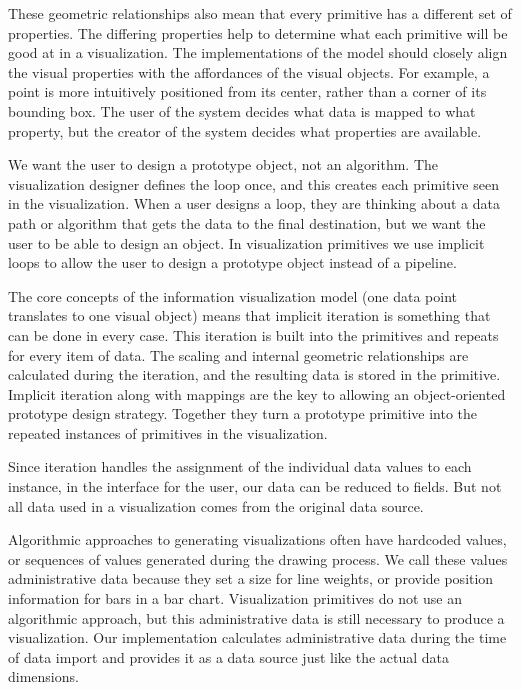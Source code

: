 These geometric relationships also mean that every primitive has a different set of properties.
The differing properties help to determine what each primitive will be good at in a visualization.
The implementations of the model should closely align the visual properties with the affordances of the visual objects.
For example, a point is more intuitively positioned from its center, rather than a corner of its bounding box.
The user of the system decides what data is mapped to what property, but the creator of the system decides what properties are available.

\label{iteration}

We want the user to design a prototype object, not an algorithm.
The visualization designer defines the loop once, and this creates each primitive seen in the visualization.
When a user designs a loop, they are thinking about a data path or algorithm that gets the data to the final destination, but we want the user to be able to design an object.
In visualization primitives we use implicit loops to allow the user to design a prototype object instead of a pipeline.

The core concepts of the information visualization model (one data point translates to one visual object) means that implicit iteration is something that can be done in every case.
This iteration is built into the primitives and repeats for every item of data.
The scaling and internal geometric relationships are calculated during the iteration, and the resulting data is stored in the primitive.
Implicit iteration along with mappings are the key to allowing an object-oriented prototype design strategy.
Together they turn a prototype primitive into the repeated instances of primitives in the visualization.

\label{data}

Since iteration handles the assignment of the individual data values to each instance, in the interface for the user, our data can be reduced to fields.
But not all data used in a visualization comes from the original data source.

Algorithmic approaches to generating visualizations often have hardcoded values, or sequences of values generated during the drawing process.
We call these values administrative data because they set a size for line weights, or provide position information for bars in a bar chart.
Visualization primitives do not use an algorithmic approach, but this administrative data is still necessary to produce a visualization.
Our implementation calculates administrative data during the time of data import and provides it as a data source just like the actual data dimensions.

